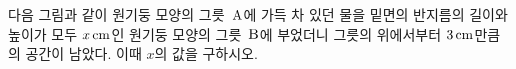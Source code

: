다음 그림과 같이 원기둥 모양의 그릇~$\mathrm{A}$에 가득 차 있던 물을 밑면의 반지름의 길이와 높이가 모두 $x\mkern3mu \mathrm{cm}$인 원기둥 모양의 그릇~$\mathrm{B}$에 부었더니 그릇의 위에서부터 $3\mkern3mu \mathrm{cm}$만큼의 공간이 남았다. 이때 $x$의 값을 구하시오. 
\par\smallskip\begin{center}\resizebox{\ifdim\width>\linewidth\linewidth\else\width\fi}{!}{}\end{center}
